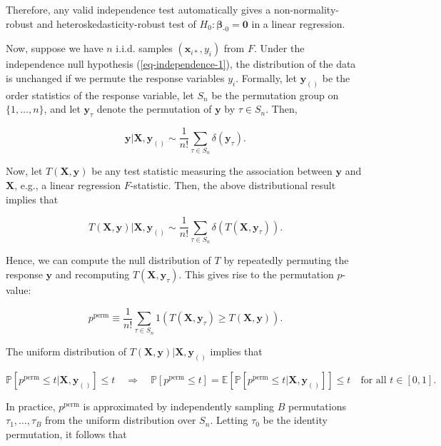 \documentclass[
  11pt,
  letterpaper,
  oneside]{book}
\theoremstyle{definition}
\theoremstyle{plain}
\theoremstyle{plain}
\theoremstyle{plain}
\theoremstyle{remark}
\begin{document}
Therefore, any valid independence test automatically gives a
non-normality-robust and heteroskedasticity-robust test of
\(H_0: \boldsymbol{\beta}_{\text{-}0} = \boldsymbol{0}\) in a linear
regression.

Now, suppose we have \(n\) i.i.d. samples \((\boldsymbol{x}_{i*}, y_i)\)
from \(F\). Under the independence null hypothesis
(\ref{eq-independence-1}), the distribution of the data is unchanged if
we permute the response variables \(y_i\). Formally, let
\(\boldsymbol{y}_{()}\) be the order statistics of the response
variable, let \(S_n\) be the permutation group on \(\{1, \dots, n\}\),
and let \(\boldsymbol{y}_\tau\) denote the permutation of
\(\boldsymbol{y}\) by \(\tau \in S_n\). Then,

\[
\boldsymbol{y} | \boldsymbol{X}, \boldsymbol{y}_{()} \sim \frac{1}{n!}\sum_{\tau \in S_n} \delta(\boldsymbol{y}_{\tau}).
\]

Now, let \(T(\boldsymbol{X}, \boldsymbol{y})\) be any test statistic
measuring the association between \(\boldsymbol{y}\) and
\(\boldsymbol{X}\), e.g., a linear regression \(F\)-statistic. Then, the
above distributional result implies that

\[
T(\boldsymbol{X}, \boldsymbol{y}) | \boldsymbol{X}, \boldsymbol{y}_{()} \sim \frac{1}{n!}\sum_{\tau \in S_n} \delta(T(\boldsymbol{X}, \boldsymbol{y}_{\tau})).
\]

Hence, we can compute the null distribution of \(T\) by repeatedly
permuting the response \(\boldsymbol{y}\) and recomputing
\(T(\boldsymbol{X}, \boldsymbol{y}_{\tau})\). This gives rise to the
permutation \(p\)-value:

\[
p^{\text{perm}} \equiv \frac{1}{n!}\sum_{\tau \in S_n} 1(T(\boldsymbol{X}, \boldsymbol{y}_{\tau}) \geq T(\boldsymbol{X}, \boldsymbol{y})).
\]

The uniform distribution of
\(T(\boldsymbol{X}, \boldsymbol{y}) | \boldsymbol{X}, \boldsymbol{y}_{()}\)
implies that

\[
\mathbb{P}[p^{\text{perm}} \leq t | \boldsymbol{X}, \boldsymbol{y}_{()}] \leq t \quad \Longrightarrow \quad \mathbb{P}[p^{\text{perm}} \leq t] = \mathbb{E}[\mathbb{P}[p^{\text{perm}} \leq t | \boldsymbol{X}, \boldsymbol{y}_{()}]] \leq t \quad \text{for all } t \in [0,1].
\]

In practice, \(p^{\text{perm}}\) is approximated by independently
sampling \(B\) permutations \(\tau_1, \dots, \tau_B\) from the uniform
distribution over \(S_n\). Letting \(\tau_0\) be the identity
permutation, it follows that
\end{document}
